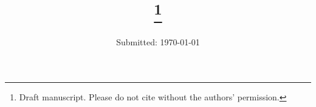 %
%
%

\thispagestyle{empty} %

  \title{\vspace{-15mm}\fontsize{21pt}{10pt}\selectfont\textbf{\thetitle \thanks{Draft manuscript. Please do not cite without the authors' permission.}}}

	\date{Submitted: \usvardate\today}

\makeatletter
\renewcommand{\@maketitle}{
\newpage
 \null
 \vskip 2em%
 \begin{center}%
  {\LARGE \@title \par}%
 \end{center}%
 \par} \makeatother

\maketitle
\linenumbers
\setlength\linenumbersep{15pt}
\renewcommand\linenumberfont{\normalfont\footnotesize\sffamily\color{gray}}
\modulolinenumbers[1]

\begin{abstract}
    \noindent\theabstract
\end{abstract}